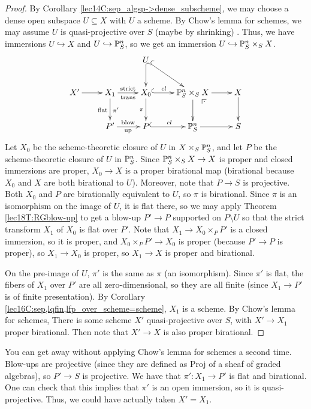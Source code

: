  \begin{proof}
   By Corollary \ref{lec14C:sep_algsp->dense_subscheme}, we may choose a dense
   open subspace $U\subseteq X$ with $U$ a scheme. By Chow's lemma for schemes, we may
   assume $U$ is quasi-projective over $S$ (maybe by shrinking) . Thus, we have immersions $U\hookrightarrow X$ and
   $U\hookrightarrow \mathbb{P}^n_S$, so we get an immersion $U\hookrightarrow \mathbb{P}^n_S\times_S
   X$.
   \[\xymatrix{
      & & U \ar@{^(->}[d] \ar@{^(->}[dr]\\
      X'\ar[r] & X_1 \ar[r]^{\text{strict}}_{\text{trans}} \ar[d]^{\pi'}_{\text{flat}} &
      X_0\ar[d]_{\pi}\ar@{^(->}[r]^<>(.5){cl} &
      \PP^n_S\times_S X \ar@{}[dr]|(.25)\pb \ar[d]\ar[r] & X\ar[d]\\
      & P'\ar[r]^{\text{blow}}_{\text{up}} & P\ar@{^(->}[r]^{cl} & \PP^n_S \ar[r] & S
   }\]
    Let $X_0$ be the scheme-theoretic closure of $U$ in $X\times_S \mathbb{P}^n_S$, and let $P$
   be the scheme-theoretic closure of $U$ in $\mathbb{P}^n_S$. Since $\mathbb{P}^n_S\times_S X\to X$ is
   proper and closed immersions are proper, $X_0\to X$ is a proper birational map
   (birational because $X_0$ and $X$ are both birational to $U$). Moreover, note that
   $P\to S$ is projective. Both $X_0$ and $P$ are birationally equivalent to $U$, so
   $\pi$ is birational. Since $\pi$ is an isomorphism on the image of $U$, it is flat
   there, so we may apply Theorem \ref{lec18T:RGblow-up} to get a blow-up $P'\to P$
   supported on $P\setminus U$ so that the strict transform $X_1$ of $X_0$ is flat over
   $P'$. Note that $X_1\to X_0\times_P P'$ is a closed immersion, so it is proper, and
   $X_0\times_P P'\to X_0$ is proper (because $P'\to P$ is proper), so $X_1\to X_0$ is
   proper, so $X_1\to X$ is proper and birational.

   On the pre-image of $U$, $\pi'$ is the same as $\pi$ (an isomorphism). Since
   $\pi'$ is flat, the fibers of $X_1$ over $P'$ are all zero-dimensional, so they are all
   finite (since $X_1\to P'$ is of finite presentation\anton{}). By Corollary
   \ref{lec16C:sep,lqfin,lfp_over_scheme=scheme}, $X_1$ is a scheme. By Chow's lemma for
   schemes,  There is some scheme $X'$
   quasi-projective over $S$, with $X'\to X_1$ proper birational. Then note that $X'\to
   X$ is also proper birational.
 \end{proof}
 \begin{remark}
   You can get away without applying Chow's lemma for schemes a second time. Blow-ups are
   projective (since they are defined as Proj of a sheaf of graded algebras), so $P'\to
   S$ is projective. We have that $\pi':X_1\to P'$ is flat and birational. One can check
   that this implies that $\pi'$ is an open immersion, so it is quasi-projective. Thus,
   we could have actually taken $X'=X_1$.
 \end{remark}

